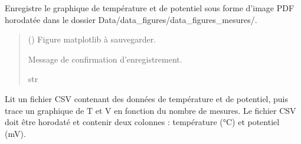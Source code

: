 \documentclass[letterpaper,10pt,english]{sphinxmanual}
\begin{document}

\begin{fulllineitems}
\label{\detokenize{Mesure:Mesure.enregistrement_pdf}}
\pysigstartsignatures
\pysiglinewithargsret
{}
{}
{}
\pysigstopsignatures
\sphinxAtStartPar

Enregistre le graphique de température et de potentiel sous forme d’image PDF
horodatée dans le dossier Data/data\_figures/data\_figures\_mesures/.
\begin{quote}\begin{description}
\sphinxAtStartPar
{} () \textendash{} Figure matplotlib à sauvegarder.

\sphinxAtStartPar
Message de confirmation d’enregistrement.

\sphinxAtStartPar
str

\end{description}\end{quote}

\end{fulllineitems}


\begin{fulllineitems}
\label{\detokenize{Mesure:Mesure.graphe_csv}}
\pysigstartsignatures
\pysiglinewithargsret
{}
{}
{}
\pysigstopsignatures
\sphinxAtStartPar

Lit un fichier CSV contenant des données de température et de potentiel, puis
trace un graphique de T et V en fonction du nombre de mesures.
Le fichier CSV doit être horodaté et contenir deux colonnes : température (°C) et potentiel (mV).

\end{fulllineitems}


\begin{fulllineitems}
\label{\detokenize{Mesure:Mesure.graphe_live}}
\pysigstartsignatures
\pysiglinewithargsret
{}
{\sphinxparamcomma {}}
{}
\pysigstopsignatures
\end{fulllineitems}
\end{document}
